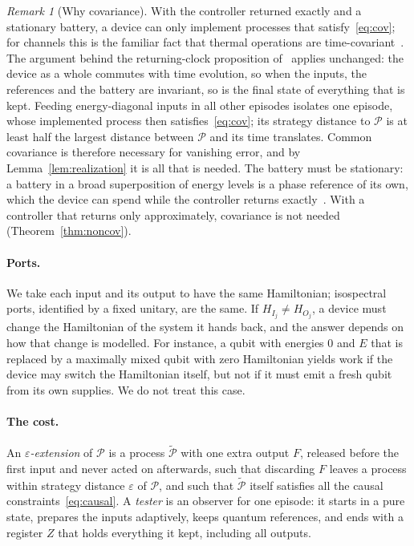\documentclass[11pt]{article}
\theoremstyle{definition}
\theoremstyle{remark}
\newtheorem{remark}{Remark}
\newcommand{\Pp}{\mathcal P}
\newcommand{\Pt}{\widetilde{\mathcal P}}
\begin{document}
\begin{remark}[Why covariance]\label{rem:cov}
With the controller returned exactly and a stationary battery, a device can only implement processes that satisfy~\eqref{eq:cov}; for channels this is the familiar fact that thermal operations are time-covariant~\cite[Sec.~3]{FBB21}. The argument behind the returning-clock proposition of~\cite{SaveWork} applies unchanged: the device as a whole commutes with time evolution, so when the inputs, the references and the battery are invariant, so is the final state of everything that is kept. Feeding energy-diagonal inputs in all other episodes isolates one episode, whose implemented process then satisfies~\eqref{eq:cov}; its strategy distance to $\Pp$ is at least half the largest distance between $\Pp$ and its time translates. Common covariance is therefore necessary for vanishing error, and by Lemma~\ref{lem:realization} it is all that is needed. The battery must be stationary: a battery in a broad superposition of energy levels is a phase reference of its own, which the device can spend while the controller returns exactly~\cite{SaveWork}. With a controller that returns only approximately, covariance is not needed (Theorem~\ref{thm:noncov}).
\end{remark}

\paragraph{Ports.} We take each input and its output to have the same Hamiltonian; isospectral ports, identified by a fixed unitary, are the same. If $H_{I_j}\ne H_{O_j}$, a device must change the Hamiltonian of the system it hands back, and the answer depends on how that change is modelled. For instance, a qubit with energies $0$ and $E$ that is replaced by a maximally mixed qubit with zero Hamiltonian yields work if the device may switch the Hamiltonian itself, but not if it must emit a fresh qubit from its own supplies. We do not treat this case.

\paragraph{The cost.} An \emph{$\varepsilon$-extension} of $\Pp$ is a process $\Pt$ with one extra output $F$, released before the first input and never acted on afterwards, such that discarding $F$ leaves a process within strategy distance $\varepsilon$ of $\Pp$, and such that $\Pt$ itself satisfies all the causal constraints~\eqref{eq:causal}. A \emph{tester} is an observer for one episode: it starts in a pure state, prepares the inputs adaptively, keeps quantum references, and ends with a register $Z$ that holds everything it kept, including all outputs.
\end{document}
